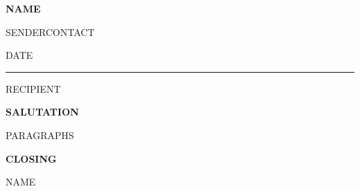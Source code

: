 \documentclass[11pt]{article}
\begin{document}
{\LARGE\bfseries\color{ink} {{NAME}}}\par
\vspace{0.1em}
{\small\color{ink} {{SENDERCONTACT}}}\par
\vspace{0.2em}
{\small\color{accent} {{DATE}}}\par
\vspace{0.3em}
{\color{accent}\rule{\textwidth}{0.8pt}}
\vspace{1em}

{{RECIPIENT}}

\vspace{1.2em}
{\bfseries {{SALUTATION}}}\par

{{PARAGRAPHS}}

\vspace{1.6em}
{\bfseries {{CLOSING}}}\par
\vspace{1em}
{\normalsize {{NAME}}}
\end{document}
